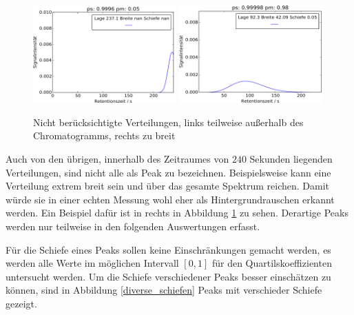 \begin{figure}[H]
\includegraphics[width=0.49\textwidth]{bilder/outof240}
\includegraphics[width=0.49\textwidth]{bilder/huegel}
\caption[Nicht berücksichtigte Verteilungen]{Nicht berücksichtigte Verteilungen, links teilweise außerhalb des Chromatogramms, rechts zu breit}
\label{kein_peak}
\end{figure}


Auch von den übrigen, innerhalb des Zeitraumes von $240$ Sekunden liegenden Verteilungen, sind nicht alle als Peak zu bezeichnen. Beispielsweise kann eine Verteilung extrem breit sein und über das gesamte Spektrum reichen. Damit würde sie in einer echten Messung wohl eher als Hintergrundrauschen erkannt werden. Ein Beispiel dafür ist in rechts in Abbildung \ref{kein_peak} zu sehen. Derartige Peaks werden nur teilweise in den folgenden Auswertungen erfasst.

Für die Schiefe eines Peaks sollen keine Einschränkungen gemacht werden, es werden alle Werte im möglichen Intervall $[0,1]$ für den Quartilskoeffizienten untersucht werden. Um die Schiefe verschiedener Peaks besser einschätzen zu können, sind in Abbildung \ref{diverse_schiefen} Peaks mit verschieder Schiefe gezeigt.

